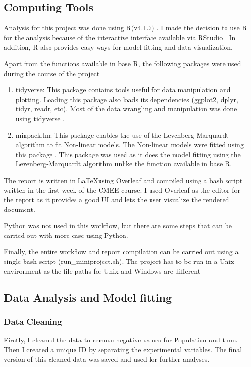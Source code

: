 \documentclass[11pt]{article}
\begin{document}
\subsection{Computing Tools}

Analysis for this project was done using R(v4.1.2) \cite{R}. I made the decision to use R for the analysis because of the interactive interface available via RStudio \cite{RStudio}. In addition, R also provides easy ways for model fitting and data visualization. 

Apart from the functions available in base R, the following packages were used during the course of the project:
\begin{enumerate}
    \item tidyverse: This package contains tools useful for data manipulation and plotting. Loading this package also loads its dependencies (ggplot2, dplyr, tidyr, readr, etc). Most of the data wrangling and manipulation was done using tidyverse \cite{tidy}.
    \item minpack.lm: This package enables the use of the Levenberg-Marquardt algorithm to fit Non-linear models. The Non-linear models were fitted using this package \cite{minpack.lm}. This package was used as it does the model fitting using the Levenberg-Marquardt algorithm unlike the function available in base R.  
\end{enumerate}

The report is written in \LaTeX using \href{http://www.overleaf.com}{Overleaf} and compiled using a bash script written in the first week of the CMEE course. I used Overleaf as the editor for the report as it provides a good UI and lets the user visualize the rendered document. 

Python was not used in this workflow, but there are some steps that can be carried out with more ease using Python. 

Finally, the entire workflow and report compilation can be carried out using a single bash script (run\_miniproject.sh). The project has to be run in a Unix environment as the file paths for Unix and Windows are different.

\subsection{Data Analysis and Model fitting}
\subsubsection{Data Cleaning}
Firstly, I cleaned the data to remove negative values for Population and time. Then I created a unique ID by separating the experimental variables. The final version of this cleaned data was saved and used for further analyses.
\end{document}
